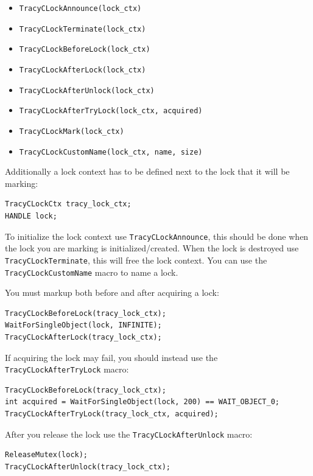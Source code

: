 \documentclass[hidelinks,titlepage,a4paper,twoside]{article}
\begin{document}
\begin{itemize}
\item \texttt{TracyCLockAnnounce(lock\_ctx)}
\item \texttt{TracyCLockTerminate(lock\_ctx)}
\item \texttt{TracyCLockBeforeLock(lock\_ctx)}
\item \texttt{TracyCLockAfterLock(lock\_ctx)}
\item \texttt{TracyCLockAfterUnlock(lock\_ctx)}
\item \texttt{TracyCLockAfterTryLock(lock\_ctx, acquired)}
\item \texttt{TracyCLockMark(lock\_ctx)}
\item \texttt{TracyCLockCustomName(lock\_ctx, name, size)}
\end{itemize}

Additionally a lock context has to be defined next to the lock that it will be marking:

\begin{lstlisting}
TracyCLockCtx tracy_lock_ctx;
HANDLE lock;
\end{lstlisting}

To initialize the lock context use \texttt{TracyCLockAnnounce}, this should be done when the lock you are marking is initialized/created. When the lock is destroyed use \texttt{TracyCLockTerminate}, this will free the lock context. You can use the \texttt{TracyCLockCustomName} macro to name a lock.

You must markup both before and after acquiring a lock:

\begin{lstlisting}
TracyCLockBeforeLock(tracy_lock_ctx);
WaitForSingleObject(lock, INFINITE);
TracyCLockAfterLock(tracy_lock_ctx);
\end{lstlisting}

If acquiring the lock may fail, you should instead use the \texttt{TracyCLockAfterTryLock} macro:

\begin{lstlisting}
TracyCLockBeforeLock(tracy_lock_ctx);
int acquired = WaitForSingleObject(lock, 200) == WAIT_OBJECT_0;
TracyCLockAfterTryLock(tracy_lock_ctx, acquired);
\end{lstlisting}

After you release the lock use the \texttt{TracyCLockAfterUnlock} macro:

\begin{lstlisting}
ReleaseMutex(lock);
TracyCLockAfterUnlock(tracy_lock_ctx);
\end{lstlisting}
\end{document}
